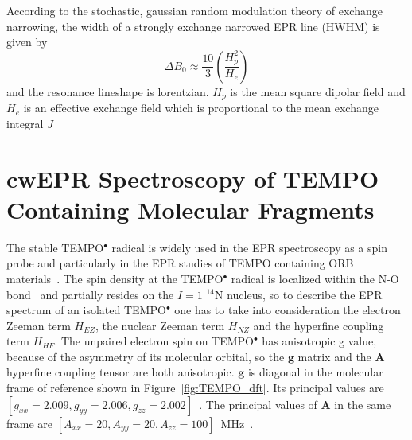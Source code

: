 According to the stochastic, gaussian random modulation theory of exchange narrowing, the width of a strongly exchange narrowed EPR line (HWHM) is given by
\begin{equation}
\label{eq:exch_narrowing}
\Delta B_0 \approx\frac{10}{3}\left(\frac{H_p^2}{H_e}\right)
\end{equation}
and the resonance lineshape is lorentzian. $H_p$ is the mean square dipolar field and $H_e$ is an effective exchange field which is proportional to the mean exchange integral $J$~\cite{Oreilly_1971}


\section{cwEPR Spectroscopy of TEMPO Containing Molecular Fragments}
The stable TEMPO$^\bullet$ radical is widely used in the EPR spectroscopy as a spin probe and particularly in the EPR studies of TEMPO containing ORB materials~\cite{nakahara2002_cpl, nishide2004_electact, bahaceci2013_jpowersources, aydin2015_jsoistatelect, khodeir2019_softmatter, Zhang2018}. The spin density at the TEMPO$^\bullet$ radical is localized within the N-O bond~\cite{Owenius2001} and partially resides on the $I=1$ $^{14}$N nucleus, so to describe the EPR spectrum of an isolated TEMPO$^\bullet$ one has to take into consideration the electron Zeeman term $H_{EZ}$, the nuclear Zeeman term $H_{NZ}$ and the hyperfine coupling term $H_{HF}$. The unpaired electron spin on TEMPO$^\bullet$ has anisotropic g value, because of the asymmetry of its molecular orbital, so the $\textbf{g}$ matrix and the $\textbf{A}$ hyperfine coupling tensor are both anisotropic. $\textbf{g}$ is diagonal in the molecular frame of reference shown in Figure~\ref{fig:TEMPO_dft}. Its principal values are $\left[g_{xx}=2.009,g_{yy}=2.006,g_{zz}=2.002\right]$~\cite{Liu_2008,Bordignon2017}. The principal values of $\textbf{A}$ in the same frame are $\left[A_{xx}=20,A_{yy}=20,A_{zz}=100\right]$~MHz~\cite{Liu_2008,Bordignon2017}.


